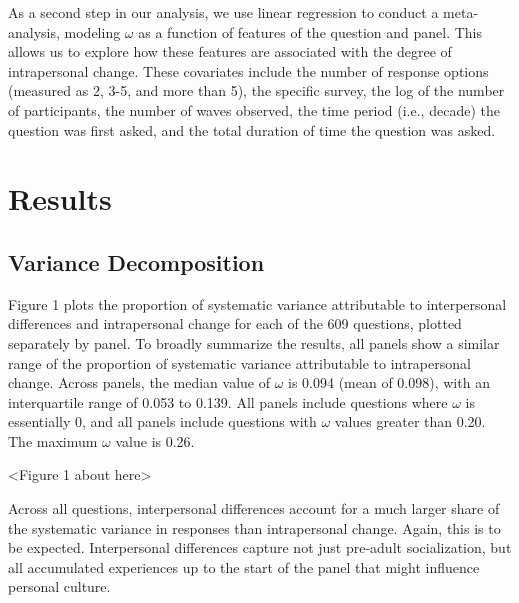 \documentclass[
  12pt,
]{article}
\begin{document}
As a second step in our analysis, we use linear regression to conduct a
meta-analysis, modeling \(\omega\) as a function of features of the
question and panel. This allows us to explore how these features are
associated with the degree of intrapersonal change. These covariates
include the number of response options (measured as 2, 3-5, and more
than 5), the specific survey, the log of the number of participants, the
number of waves observed, the time period (i.e., decade) the question
was first asked, and the total duration of time the question was asked.

\hypertarget{results}{%
\section{Results}\label{results}}

\hypertarget{variance-decomposition}{%
\subsection{Variance Decomposition}\label{variance-decomposition}}

Figure 1 plots the proportion of systematic variance attributable to
interpersonal differences and intrapersonal change for each of the 609
questions, plotted separately by panel. To broadly summarize the
results, all panels show a similar range of the proportion of systematic
variance attributable to intrapersonal change. Across panels, the median
value of \(\omega\) is 0.094 (mean of 0.098), with an interquartile
range of 0.053 to 0.139. All panels include questions where \(\omega\)
is essentially 0, and all panels include questions with \(\omega\)
values greater than 0.20. The maximum \(\omega\) value is 0.26.

\begin{center}
<Figure 1 about here>
\end{center}

Across all questions, interpersonal differences account for a much
larger share of the systematic variance in responses than intrapersonal
change. Again, this is to be expected. Interpersonal differences capture
not just pre-adult socialization, but all accumulated experiences up to
the start of the panel that might influence personal culture.
\end{document}
